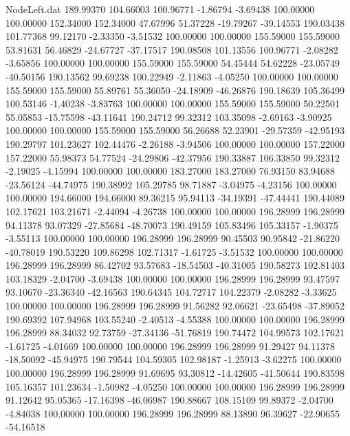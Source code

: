 \begin{filecontents}{NodeLeft.dat}
 189.99370  104.66003  100.96771    -1.86794   -3.69438  100.00000  100.00000  152.34000  152.34000   47.67996   51.37228  -19.79267  -39.14553
 190.03438  101.77368   99.12170    -2.33350   -3.51532  100.00000  100.00000  155.59000  155.59000   53.81631   56.46829  -24.67727  -37.17517
 190.08508  101.13556  100.96771    -2.08282   -3.65856  100.00000  100.00000  155.59000  155.59000   54.45444   54.62228  -23.05749  -40.50156
 190.13562   99.69238  100.22949    -2.11863   -4.05250  100.00000  100.00000  155.59000  155.59000   55.89761   55.36050  -24.18909  -46.26876
 190.18639  105.36499  100.53146    -1.40238   -3.83763  100.00000  100.00000  155.59000  155.59000   50.22501   55.05853  -15.75598  -43.11641
 190.24712   99.32312  103.35098    -2.69163   -3.90925  100.00000  100.00000  155.59000  155.59000   56.26688   52.23901  -29.57359  -42.95193
 190.29797  101.23627  102.44476    -2.26188   -3.94506  100.00000  100.00000  157.22000  157.22000   55.98373   54.77524  -24.29806  -42.37956
 190.33887  106.33850   99.32312    -2.19025   -4.15994  100.00000  100.00000  183.27000  183.27000   76.93150   83.94688  -23.56124  -44.74975
 190.38992  105.29785   98.71887    -3.04975   -4.23156  100.00000  100.00000  194.66000  194.66000   89.36215   95.94113  -34.19391  -47.44441
 190.44089  102.17621  103.21671    -2.44094   -4.26738  100.00000  100.00000  196.28999  196.28999   94.11378   93.07329  -27.85684  -48.70073
 190.49159  105.83496  105.33157    -1.90375   -3.55113  100.00000  100.00000  196.28999  196.28999   90.45503   90.95842  -21.86220  -40.78019
 190.53220  109.86298  102.71317    -1.61725   -3.51532  100.00000  100.00000  196.28999  196.28999   86.42702   93.57683  -18.54503  -40.31005
 190.58273  102.81403  103.18329    -2.04700   -3.69438  100.00000  100.00000  196.28999  196.28999   93.47597   93.10670  -23.36340  -42.16563
 190.64345  104.72717  104.22379    -2.08282   -3.33625  100.00000  100.00000  196.28999  196.28999   91.56282   92.06621  -23.65498  -37.89052
 190.69392  107.94968  103.55240    -2.40513   -4.55388  100.00000  100.00000  196.28999  196.28999   88.34032   92.73759  -27.34136  -51.76819
 190.74472  104.99573  102.17621    -1.61725   -4.01669  100.00000  100.00000  196.28999  196.28999   91.29427   94.11378  -18.50092  -45.94975
 190.79544  104.59305  102.98187    -1.25913   -3.62275  100.00000  100.00000  196.28999  196.28999   91.69695   93.30812  -14.42605  -41.50644
 190.83598  105.16357  101.23634    -1.50982   -4.05250  100.00000  100.00000  196.28999  196.28999   91.12642   95.05365  -17.16398  -46.06987
 190.88667  108.15109   99.89372    -2.04700   -4.84038  100.00000  100.00000  196.28999  196.28999   88.13890   96.39627  -22.90655  -54.16518

\end{filecontents}
